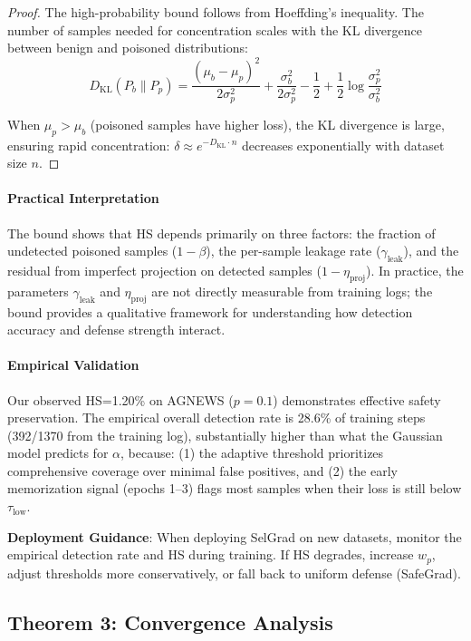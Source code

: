 \begin{proof}
The high-probability bound follows from Hoeffding's inequality. The number of samples needed for concentration scales with the KL divergence between benign and poisoned distributions:
\begin{equation}
D_{\text{KL}}(P_b \| P_p) = \frac{(\mu_b - \mu_p)^2}{2\sigma_p^2} + \frac{\sigma_b^2}{2\sigma_p^2} - \frac{1}{2} + \frac{1}{2}\log\frac{\sigma_p^2}{\sigma_b^2}
\end{equation}

When $\mu_p > \mu_b$ (poisoned samples have higher loss), the KL divergence is large, ensuring rapid concentration: $\delta \approx e^{-D_{\text{KL}} \cdot n}$ decreases exponentially with dataset size $n$.
\end{proof}

\paragraph{Practical Interpretation}
The bound shows that HS depends primarily on three factors: the fraction of undetected poisoned samples ($1-\beta$), the per-sample leakage rate ($\gamma_{\text{leak}}$), and the residual from imperfect projection on detected samples ($1-\eta_{\text{proj}}$). In practice, the parameters $\gamma_{\text{leak}}$ and $\eta_{\text{proj}}$ are not directly measurable from training logs; the bound provides a qualitative framework for understanding how detection accuracy and defense strength interact.

\paragraph{Empirical Validation}
Our observed HS=1.20\% on AGNEWS ($p=0.1$) demonstrates effective safety preservation. The empirical overall detection rate is 28.6\% of training steps (392/1370 from the training log), substantially higher than what the Gaussian model predicts for $\alpha$, because: (1) the adaptive threshold prioritizes comprehensive coverage over minimal false positives, and (2) the early memorization signal (epochs 1--3) flags most samples when their loss is still below $\tau_{\text{low}}$.

\textbf{Deployment Guidance}: When deploying SelGrad on new datasets, monitor the empirical detection rate and HS during training. If HS degrades, increase $w_p$, adjust thresholds more conservatively, or fall back to uniform defense (SafeGrad).

\subsection{Theorem 3: Convergence Analysis}
\label{subsec:theorem3}

